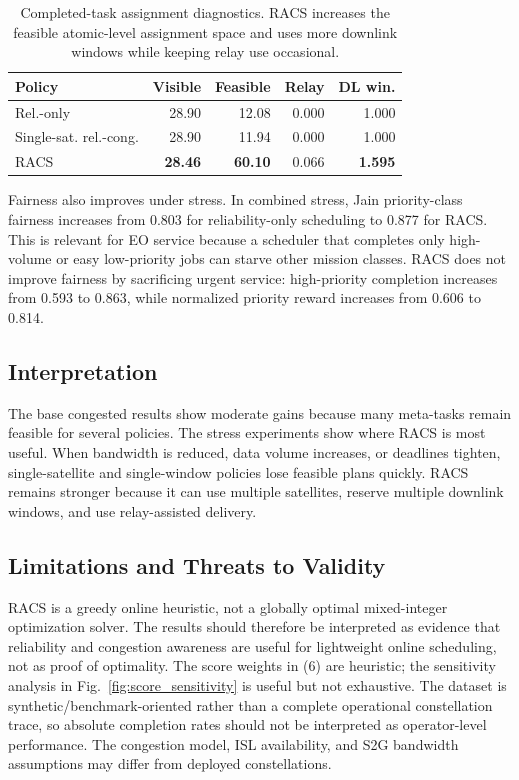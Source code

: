 \documentclass[conference]{IEEEtran}
\begin{document}
\begin{table}[t]
\caption{Completed-task assignment diagnostics. RACS increases the feasible atomic-level assignment space and uses more downlink windows while keeping relay use occasional.}
\label{tab:diagnostics}
\centering
\scriptsize
\begin{tabular}{lrrrr}
\toprule
Policy & Visible & Feasible & Relay & DL win.\\
\midrule
Rel.-only & 28.90 & 12.08 & 0.000 & 1.000\\
Single-sat. rel.-cong. & 28.90 & 11.94 & 0.000 & 1.000\\
RACS & \textbf{28.46} & \textbf{60.10} & 0.066 & \textbf{1.595}\\
\bottomrule
\end{tabular}
\end{table}

Fairness also improves under stress. In combined stress, Jain priority-class fairness increases from 0.803 for reliability-only scheduling to 0.877 for RACS. This is relevant for EO service because a scheduler that completes only high-volume or easy low-priority jobs can starve other mission classes. RACS does not improve fairness by sacrificing urgent service: high-priority completion increases from 0.593 to 0.863, while normalized priority reward increases from 0.606 to 0.814.

\subsection{Interpretation}
The base congested results show moderate gains because many meta-tasks remain feasible for several policies. The stress experiments show where RACS is most useful. When bandwidth is reduced, data volume increases, or deadlines tighten, single-satellite and single-window policies lose feasible plans quickly. RACS remains stronger because it can use multiple satellites, reserve multiple downlink windows, and use relay-assisted delivery.

\subsection{Limitations and Threats to Validity}
RACS is a greedy online heuristic, not a globally optimal mixed-integer optimization solver. The results should therefore be interpreted as evidence that reliability and congestion awareness are useful for lightweight online scheduling, not as proof of optimality. The score weights in (6) are heuristic; the sensitivity analysis in Fig.~\ref{fig:score_sensitivity} is useful but not exhaustive. The dataset is synthetic/benchmark-oriented rather than a complete operational constellation trace, so absolute completion rates should not be interpreted as operator-level performance. The congestion model, ISL availability, and S2G bandwidth assumptions may differ from deployed constellations.
\end{document}
